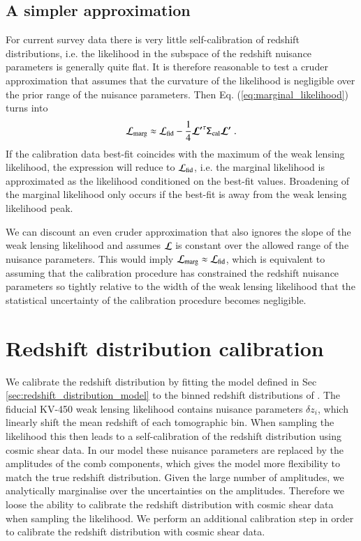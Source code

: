 \documentclass{aa}
\newcommand{\eq}[1]{\begin{equation}  #1 \end{equation}}
\begin{document}
\subsection{A simpler approximation}

For current survey data there is very little self-calibration of redshift distributions, i.e. the likelihood in the subspace of the redshift nuisance parameters is generally quite flat. It is therefore reasonable to test a cruder approximation that assumes that the curvature of the likelihood is negligible over the prior range of the nuisance parameters. Then Eq. (\ref{eq:marginal_likelihood}) turns into
\eq{
{\cal L}_{\rm marg} \approx {\cal L}_{\rm fid} - \frac{1}{4} \boldsymbol{\cal L^\prime}^\tau  \tens{\Sigma}_{\rm cal} \boldsymbol{\cal L^\prime} \;.
}
If the calibration data best-fit coincides with the maximum of the weak lensing likelihood, the expression will reduce to ${\cal L}_{\rm fid}$, i.e. the marginal likelihood is approximated as the likelihood conditioned on the best-fit values. Broadening of the marginal likelihood only occurs if the best-fit is away from the weak lensing likelihood peak.

We can discount an even cruder approximation that also ignores the slope of the weak lensing likelihood and assumes ${\cal L}$ is constant over the allowed range of the nuisance parameters. This would imply ${\cal L}_{\rm marg} \approx {\cal L}_{\rm fid}$, which is equivalent to assuming that the calibration procedure has constrained the redshift nuisance parameters so tightly relative to the width of the weak lensing likelihood that the statistical uncertainty of the calibration procedure becomes negligible.
\section{Redshift distribution calibration}
We calibrate the redshift distribution by fitting the model defined in Sec \ref{sec:redshift_distribution_model} to the binned redshift distributions of . The fiducial KV-450 weak lensing likelihood contains nuisance parameters $\delta z_i$, which linearly shift the mean redshift of each tomographic bin. When sampling the likelihood this then leads to a self-calibration of the redshift distribution using cosmic shear data. In our model these nuisance parameters are replaced by the amplitudes of the comb components, which gives the model more flexibility to match the true redshift distribution. Given the large number of amplitudes, we analytically marginalise over the uncertainties on the amplitudes. Therefore we loose the ability to calibrate the redshift distribution with cosmic shear data when sampling the likelihood. We perform an additional calibration step in order to calibrate the redshift distribution with cosmic shear data. 
\end{document}
